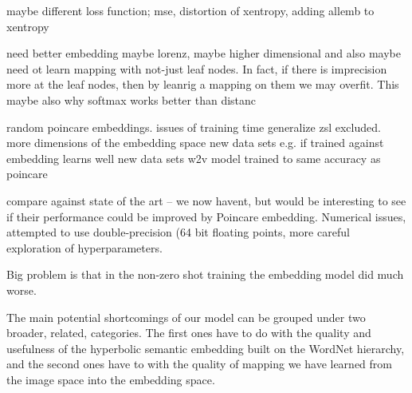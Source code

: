 \documentclass[12pt]{report}
\begin{document}
maybe different loss function; mse, distortion of xentropy, adding allemb to xentropy

need better embedding maybe lorenz, maybe higher dimensional and also maybe need ot learn mapping with not-just leaf nodes. In fact, if there is imprecision more at the leaf nodes, then by leanrig a mapping on them we may overfit. This maybe also why softmax works better than distanc

random poincare embeddings.
issues of training time
generalize zsl excluded.
more dimensions of the embedding space
new data sets e.g. if trained against embedding learns well new data sets
w2v model trained to same accuracy as poincare  

compare against state of the art -- we now havent, but would be interesting to see if their performance could be improved by Poincare embedding.
Numerical issues, attempted to use double-precision (64 bit floating points, more careful exploration of hyperparameters.












Big problem is that in the non-zero shot training the embedding model did much worse.

The main potential shortcomings of our model can be grouped under two broader, related, categories. The first ones have to do with the quality and usefulness of the hyperbolic semantic embedding built on the WordNet hierarchy, and the second ones have to with the quality of mapping we have learned from the image space into the embedding space.
\end{document}
